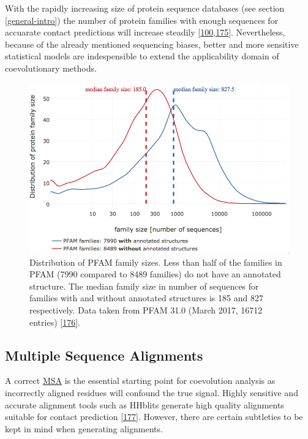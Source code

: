 \documentclass[11pt,a4paper,twoside]{book}
\theoremstyle{definition}
\theoremstyle{definition}
\theoremstyle{remark}
\begin{document}
With the rapidly increasing size of protein sequence databases (see
section \ref{general-intro}) the number of protein families with enough
sequences for accuarate contact predictions will increase steadily
{[}\protect\hyperlink{ref-Kamisetty2013}{100},\protect\hyperlink{ref-TheUniProtConsortium2013}{175}{]}.
Nevertheless, because of the already mentioned sequencing biases, better
and more sensitive statistical models are indespensible to extend the
applicability domain of coevolutionary methods.








\begin{figure}

{\centering \includegraphics[width=0.9\linewidth]{img/pfam_pdb_notitle} 

}

\caption{Distribution of PFAM family sizes. Less than half of
the families in PFAM (7990 compared to 8489 families) do not have an
annotated structure. The median family size in number of sequences for
families with and without annotated structures is 185 and 827
respectively. Data taken from PFAM 31.0 (March 2017, 16712 entries)
{[}\protect\hyperlink{ref-Finn2016}{176}{]}.}\label{fig:pfam}
\end{figure}

\subsection{Multiple Sequence
Alignments}\label{multiple-sequence-alignments}

A correct \protect\hyperlink{abbrev}{MSA} is the essential starting
point for coevolution analysis as incorrectly aligned residues will
confound the true signal. Highly sensitive and accurate alignment tools
such as HHblits generate high quality alignments suitable for contact
prediction {[}\protect\hyperlink{ref-Remmert2012}{177}{]}. However,
there are certain subtleties to be kept in mind when generating
alignments.
\end{document}
